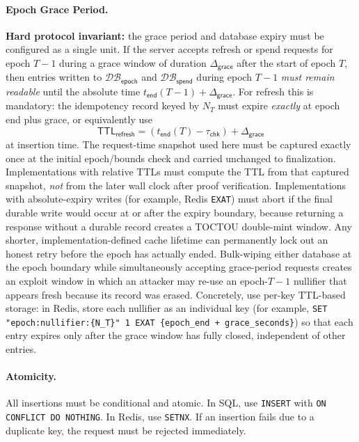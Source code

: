 \documentclass[11pt]{article}
\theoremstyle{definitionstyle}
\theoremstyle{plain}
\newcommand{\DB}{\mathcal{DB}}
\begin{document}
\paragraph{Epoch Grace Period.}
\textbf{Hard protocol invariant:} the grace period and database expiry must be configured as a single unit. If the server accepts refresh or spend requests for epoch $T-1$ during a grace window of duration $\Delta_{\mathsf{grace}}$ after the start of epoch $T$, then entries written to $\DB_{\mathsf{epoch}}$ and $\DB_{\mathsf{spend}}$ during epoch $T-1$ \emph{must remain readable} until the absolute time $t_{\mathsf{end}}(T-1)+\Delta_{\mathsf{grace}}$. For refresh this is mandatory: the idempotency record keyed by $N_T$ must expire \emph{exactly} at epoch end plus grace, or equivalently use
\[
\mathsf{TTL}_{\mathsf{refresh}} = (t_{\mathsf{end}}(T)-\tau_{\mathsf{chk}})+\Delta_{\mathsf{grace}}
\]
at insertion time. The request-time snapshot used here must be captured exactly once at the initial epoch/bounds check and carried unchanged to finalization. Implementations with relative TTLs must compute the TTL from that captured snapshot, \emph{not} from the later wall clock after proof verification. Implementations with absolute-expiry writes (for example, Redis \texttt{EXAT}) must abort if the final durable write would occur at or after the expiry boundary, because returning a response without a durable record creates a TOCTOU double-mint window. Any shorter, implementation-defined cache lifetime can permanently lock out an honest retry before the epoch has actually ended. Bulk-wiping either database at the epoch boundary while simultaneously accepting grace-period requests creates an exploit window in which an attacker may re-use an epoch-$T{-}1$ nullifier that appears fresh because its record was erased. Concretely, use per-key TTL-based storage: in Redis, store each nullifier as an individual key (for example, \nolinkurl{SET "epoch:nullifier:{N_T}" 1 EXAT {epoch_end + grace_seconds}}) so that each entry expires only after the grace window has fully closed, independent of other entries.

\paragraph{Atomicity.}
All insertions must be conditional and atomic. In SQL, use \texttt{INSERT} with \texttt{ON CONFLICT DO NOTHING}. In Redis, use \texttt{SETNX}. If an insertion fails due to a duplicate key, the request must be rejected immediately.
\end{document}
